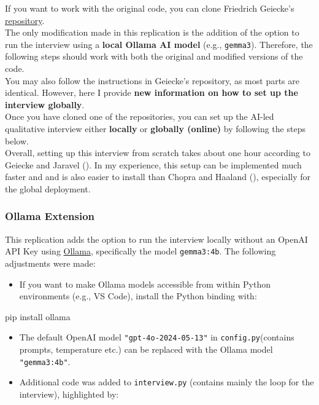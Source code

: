 \documentclass[
  letterpaper,
  DIV=11,
  numbers=noendperiod]{scrartcl}
\newenvironment{Shaded}{\begin{snugshade}}{\end{snugshade}}
\newcommand{\ExtensionTok}[1]{\textcolor[rgb]{0.00,0.23,0.31}{#1}}
\newcommand{\NormalTok}[1]{\textcolor[rgb]{0.00,0.23,0.31}{#1}}
\providecommand{\tightlist}{%
  \setlength{\itemsep}{0pt}\setlength{\parskip}{0pt}}
\begin{document}
If you want to work with the original code, you can clone Friedrich
Geiecke's
\href{https://github.com/friedrichgeiecke/interviews}{repository}.\\
The only modification made in this replication is the addition of the
option to run the interview using a \textbf{local Ollama AI model}
(e.g., \texttt{gemma3}). Therefore, the following steps should work with
both the original and modified versions of the code.\\
You may also follow the instructions in Geiecke's repository, as most
parts are identical. However, here I provide \textbf{new information on
how to set up the interview globally}.\\
Once you have cloned one of the repositories, you can set up the AI-led
qualitative interview either \textbf{locally} or \textbf{globally
(online)} by following the steps below.\\
Overall, setting up this interview from scratch takes about one hour
according to Geiecke and Jaravel
(). In my experience, this
setup can be implemented much faster and and is also easier to install
than Chopra and Haaland (),
especially for the global deployment.

\subsubsection{Ollama Extension}\label{sec-replication-geiecke-ollama}

This replication adds the option to run the interview locally without an
OpenAI API Key using \href{https://ollama.com/download/windows}{Ollama},
specifically the model \texttt{gemma3:4b}. The following adjustments
were made:

\begin{itemize}
\tightlist
\item
  If you want to make Ollama models accessible from within Python
  environments (e.g., VS Code), install the Python binding with:
\end{itemize}

\begin{Shaded}
\begin{Highlighting}[]
    \ExtensionTok{pip}\NormalTok{ install ollama}
\end{Highlighting}
\end{Shaded}

\begin{itemize}
\tightlist
\item
  The default OpenAI model \texttt{"gpt-4o-2024-05-13"} in
  \texttt{config.py}(contains prompts, temperature etc.) can be replaced
  with the Ollama model \texttt{"gemma3:4b"}.\\
\item
  Additional code was added to \texttt{interview.py} (contains mainly
  the loop for the interview), highlighted by:
\end{itemize}
\end{document}
